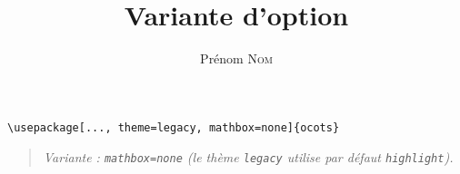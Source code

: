 \documentclass[11pt]{ocots-book}
\title{Variante d'option}
\author{Prénom \textsc{Nom}}
\newcommand{\ocotsvariantnote}[1]{\begin{quote}\itshape Variante : #1\end{quote}}
\begin{document}
\maketitle

\begin{lstlisting}
\usepackage[..., theme=legacy, mathbox=none]{ocots}
\end{lstlisting}
\ocotsvariantnote{\texttt{mathbox=none} (le th\`eme \texttt{legacy} utilise par d\'efaut \texttt{highlight}).}

\end{document}
